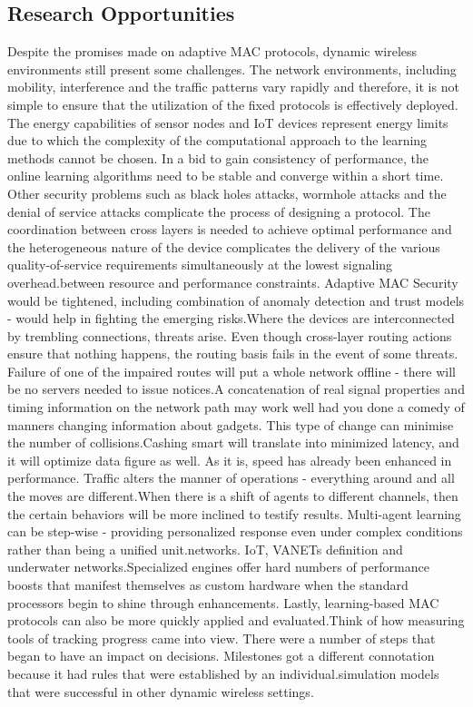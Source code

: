 \documentclass[a4paper,fleqn]{cas-dc}
\numberwithin{equation}{section}
\begin{document}
\subsection{Research Opportunities}
Despite the promises made on adaptive MAC protocols, dynamic wireless environments still present some challenges. The network environments, including mobility, interference and the traffic patterns vary rapidly and therefore, it is not simple to ensure that the utilization of the fixed protocols is effectively deployed. The energy capabilities of sensor nodes and IoT devices represent energy limits due to which the complexity of the computational approach to the learning methods cannot be chosen. In a bid to gain consistency of performance, the online learning algorithms need to be stable and converge within a short time. Other security problems such as black holes attacks, wormhole attacks and the denial of service attacks complicate the process of designing a protocol. The coordination between cross layers is needed to achieve optimal performance and the heterogeneous nature of the device complicates the delivery of the various quality-of-service requirements simultaneously at the lowest signaling overhead.between resource and performance constraints. Adaptive MAC Security would be tightened, including combination of anomaly detection and trust models - would help in fighting the emerging risks.Where the devices are interconnected by trembling connections, threats arise. Even though cross-layer routing actions ensure that nothing happens, the routing basis fails in the event of some threats. Failure of one of the impaired routes will put a whole network offline - there will be no servers needed to issue notices.A concatenation of real signal properties and timing information on the network path may work well had you done a comedy of manners changing information about gadgets. This type of change can minimise the number of collisions.Cashing smart will translate into minimized latency, and it will optimize data figure as well. As it is, speed has already been enhanced in performance.
Traffic alters the manner of operations - everything around and all the moves are different.When there is a shift of agents to different channels, then the certain behaviors will be more inclined to testify results. Multi-agent learning can be step-wise - providing personalized response even under complex conditions rather than being a unified unit.networks. IoT, VANETs definition and underwater networks.Specialized engines offer hard numbers of performance boosts that manifest themselves as custom hardware when the standard processors begin to shine through enhancements. Lastly, learning-based MAC protocols can also be more quickly applied and evaluated.Think of how measuring tools of tracking progress came into view. There were a number of steps that began to have an impact on decisions. Milestones got a different connotation because it had rules that were established by an individual.simulation models that were successful in other dynamic wireless settings.\cite{Latif2025156170}
\end{document}
